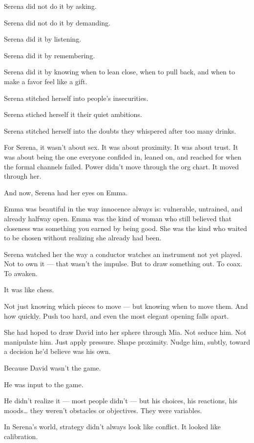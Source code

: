 Serena did not do it by asking. 

Serena did not do it by demanding.  

Serena did it by listening. 

Serena did it by remembering. 

Serena did it by knowing when to lean close, when to pull back, and when to make a favor feel like a gift.

Serena stitched herself into people’s insecurities. 

Serena stiched herself it their quiet ambitions. 

Serena stitched herself into the doubts they whispered after too many drinks.  

For Serena, it wasn’t about sex.  
It was about proximity.  
It was about trust.  
It was about being the one everyone confided in, 
leaned on, and reached for when the formal channels failed.
Power didn’t move through the org chart.  
It moved through her.  

And now, Serena had her eyes on Emma.

Emma was beautiful in the way innocence always is: vulnerable, untrained, and already halfway open.
Emma was the kind of woman who still believed that closeness was something you earned by being good.
She was the kind who waited to be chosen without realizing she already had been.

Serena watched her the way a conductor watches an instrument not yet played.
Not to own it — that wasn’t the impulse.
But to draw something out. To coax. To awaken.

It was like chess.

Not just knowing which pieces to move —
but knowing when to move them.
And how quickly.
Push too hard, and even the most elegant opening falls apart.

She had hoped to draw David into her sphere through Mia.
Not seduce him. Not manipulate him.
Just apply pressure. Shape proximity. Nudge him, subtly, toward a decision he’d believe was his own.

Because David wasn’t the game.

He was input to the game.

He didn’t realize it — most people didn’t — but his choices, his reactions, his moods…
they weren’t obstacles or objectives.
They were variables.

In Serena’s world, strategy didn’t always look like conflict.
It looked like calibration.

